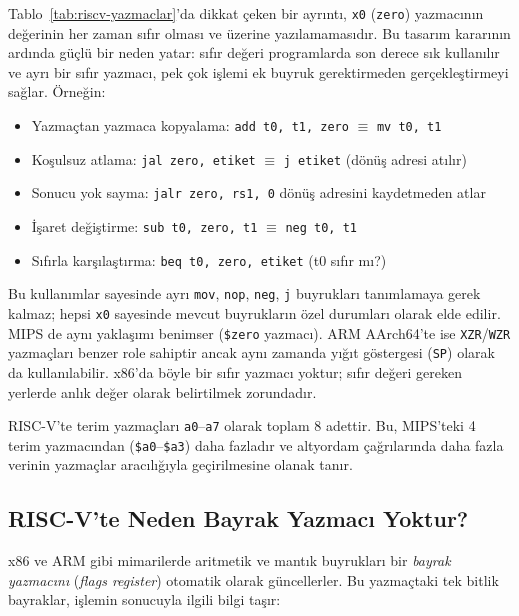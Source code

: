 Tablo~\ref{tab:riscv-yazmaclar}'da dikkat çeken bir ayrıntı, \texttt{x0} (\texttt{zero}) yazmacının değerinin her zaman sıfır olması ve üzerine yazılamamasıdır. Bu tasarım kararının ardında güçlü bir neden yatar: sıfır değeri programlarda son derece sık kullanılır ve ayrı bir sıfır yazmacı, pek çok işlemi ek buyruk gerektirmeden gerçekleştirmeyi sağlar. Örneğin:

\begin{itemize}[nosep]
\item Yazmaçtan yazmaca kopyalama: \texttt{add t0, t1, zero} $\equiv$ \texttt{mv t0, t1}
\item Koşulsuz atlama: \texttt{jal zero, etiket} $\equiv$ \texttt{j etiket} (dönüş adresi atılır)
\item Sonucu yok sayma: \texttt{jalr zero, rs1, 0} dönüş adresini kaydetmeden atlar
\item İşaret değiştirme: \texttt{sub t0, zero, t1} $\equiv$ \texttt{neg t0, t1}
\item Sıfırla karşılaştırma: \texttt{beq t0, zero, etiket} (t0 sıfır mı?)
\end{itemize}

Bu kullanımlar sayesinde ayrı \texttt{mov}, \texttt{nop}, \texttt{neg}, \texttt{j} buyrukları tanımlamaya gerek kalmaz; hepsi \texttt{x0} sayesinde mevcut buyrukların özel durumları olarak elde edilir. MIPS de aynı yaklaşımı benimser (\texttt{\$zero} yazmacı). ARM AArch64'te ise \texttt{XZR}/\texttt{WZR} yazmaçları benzer role sahiptir ancak aynı zamanda yığıt göstergesi (\texttt{SP}) olarak da kullanılabilir. x86'da böyle bir sıfır yazmacı yoktur; sıfır değeri gereken yerlerde anlık değer olarak belirtilmek zorundadır.

RISC-V'te terim yazmaçları \texttt{a0}--\texttt{a7} olarak toplam 8 adettir. Bu, MIPS'teki 4 terim yazmacından (\texttt{\$a0}--\texttt{\$a3}) daha fazladır ve altyordam çağrılarında daha fazla verinin yazmaçlar aracılığıyla geçirilmesine olanak tanır.

\subsection{RISC-V'te Neden Bayrak Yazmacı Yoktur?}
\label{subsec:bayrak-yazmaci}

x86 ve ARM gibi mimarilerde aritmetik ve mantık buyrukları bir \emph{bayrak yazmacını} (\emph{flags register}) otomatik olarak güncellerler. Bu yazmaçtaki tek bitlik bayraklar, işlemin sonucuyla ilgili bilgi taşır:

